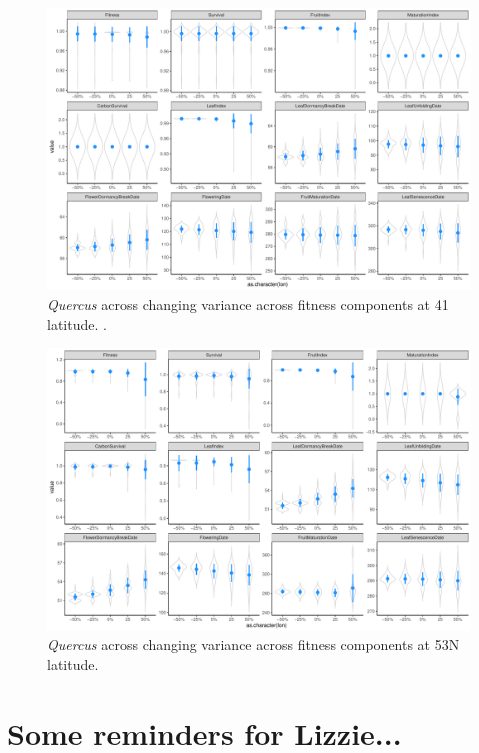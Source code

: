 \documentclass[11pt,letter]{article}
\begin{document}
\begin{figure} 
 \begin{center}
\noindent \includegraphics[width=1\textwidth]{..//analyses/graphs/phenofit/sims/sdsim41_allmetricsQR.pdf}
  \caption{\emph{Quercus} across changing variance across fitness components at 41 latitude. .}
  \label{fig:quercussd41}
  \end{center}
\end{figure}

\begin{figure} 
 \begin{center}
\noindent \includegraphics[width=1\textwidth]{..//analyses/graphs/phenofit/sims/sdsim53_allmetricsQR.pdf}
  \caption{\emph{Quercus} across changing variance across fitness components at 53\degree N latitude. }
  \label{fig:quercussd53}
  \end{center}
\end{figure}

\section{Some reminders for Lizzie... }
\end{document}
